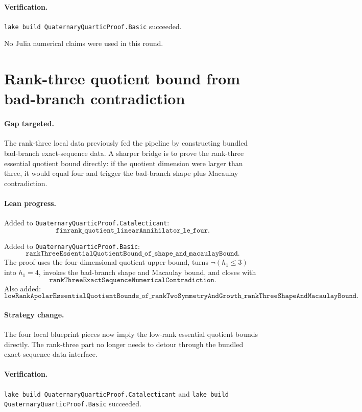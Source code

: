 \documentclass[11pt]{article}
\begin{document}
\paragraph{Verification.}
\texttt{lake build QuaternaryQuarticProof.Basic} succeeded.

No Julia numerical claims were used in this round.

\section*{Rank-three quotient bound from bad-branch contradiction}

\paragraph{Gap targeted.}
The rank-three local data previously fed the pipeline by constructing bundled
bad-branch exact-sequence data.  A sharper bridge is to prove the rank-three
essential quotient bound directly: if the quotient dimension were larger than
three, it would equal four and trigger the bad-branch shape plus Macaulay
contradiction.

\paragraph{Lean progress.}
Added to \texttt{QuaternaryQuarticProof.Catalecticant}:
\[
\texttt{finrank\_quotient\_linearAnnihilator\_le\_four}.
\]

Added to \texttt{QuaternaryQuarticProof.Basic}:
\[
\texttt{rankThreeEssentialQuotientBound\_of\_shape\_and\_macaulayBound}.
\]
The proof uses the four-dimensional quotient upper bound, turns
\(\neg(h_1\le3)\) into \(h_1=4\), invokes the bad-branch shape and Macaulay
bound, and closes with
\[
\texttt{rankThreeExactSequenceNumericalContradiction}.
\]
Also added:
\[
\texttt{lowRankApolarEssentialQuotientBounds\_of\_rankTwoSymmetryAndGrowth\_rankThreeShapeAndMacaulayBound}.
\]

\paragraph{Strategy change.}
The four local blueprint pieces now imply the low-rank essential quotient
bounds directly.  The rank-three part no longer needs to detour through the
bundled exact-sequence-data interface.

\paragraph{Verification.}
\texttt{lake build QuaternaryQuarticProof.Catalecticant} and
\texttt{lake build QuaternaryQuarticProof.Basic} succeeded.
\end{document}
